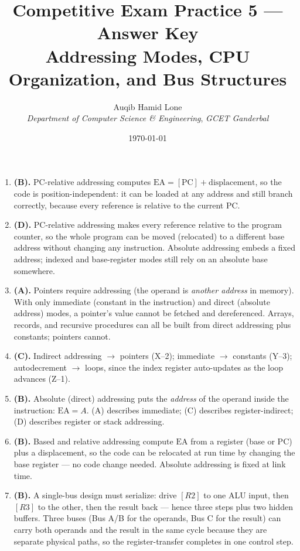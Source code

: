 \documentclass[11pt]{article}
\title{Competitive Exam Practice 5 --- Answer Key\\\large Addressing Modes, CPU Organization, and Bus Structures}
\author{Auqib Hamid Lone\\[0.3em]
  \emph{Department of Computer Science \& Engineering}, \emph{GCET Ganderbal}}
\date{\today}
\begin{document}
\maketitle

\begin{enumerate}
\item[\textbf{Q1}] \textbf{(B).} PC-relative addressing computes $\text{EA} = [\text{PC}] + \text{displacement}$, so the code is position-independent: it can be loaded at any address and still branch correctly, because every reference is relative to the current PC.

\item[\textbf{Q2}] \textbf{(D).} PC-relative addressing makes every reference relative to the program counter, so the whole program can be moved (relocated) to a different base address without changing any instruction. Absolute addressing embeds a fixed address; indexed and base-register modes still rely on an absolute base somewhere.

\item[\textbf{Q3}] \textbf{(A).} Pointers require  addressing (the operand is \emph{another address} in memory). With only immediate (constant in the instruction) and direct (absolute address) modes, a pointer's value cannot be fetched and dereferenced. Arrays, records, and recursive procedures can all be built from direct addressing plus constants; pointers cannot.

\item[\textbf{Q4}] \textbf{(C).} Indirect addressing $\to$ pointers (X--2); immediate $\to$ constants (Y--3); autodecrement $\to$ loops, since the index register auto-updates as the loop advances (Z--1).

\item[\textbf{Q5}] \textbf{(B).} Absolute (direct) addressing puts the \emph{address} of the operand inside the instruction: $\text{EA} = A$. (A) describes immediate; (C) describes register-indirect; (D) describes register or stack addressing.

\item[\textbf{Q6}] \textbf{(B).} Based and relative addressing compute $\text{EA}$ from a register (base or PC) plus a displacement, so the code can be relocated at run time by changing the base register --- no code change needed. Absolute addressing is fixed at link time.

\item[\textbf{Q7}] \textbf{(B).} A single-bus design must serialize: drive $[R2]$ to one ALU input, then $[R3]$ to the other, then the result back --- hence three steps plus two hidden buffers. Three buses (Bus A/B for the operands, Bus C for the result) can carry both operands and the result in the same cycle because they are separate physical paths, so the register-transfer completes in one control step.
\end{enumerate}
\end{document}
